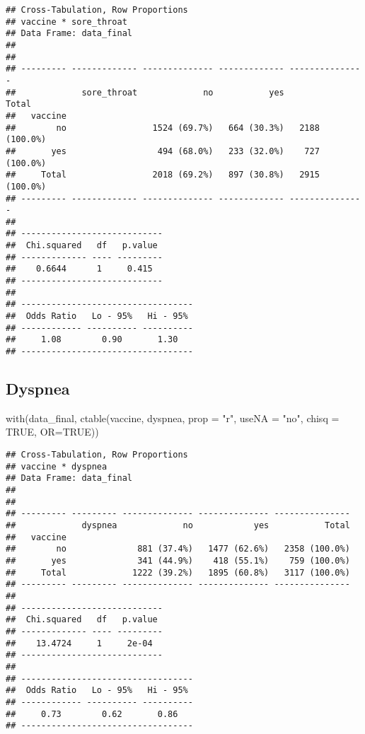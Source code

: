 \documentclass[
]{article}
\newenvironment{Shaded}{\begin{snugshade}}{\end{snugshade}}
\newcommand{\AttributeTok}[1]{\textcolor[rgb]{0.77,0.63,0.00}{#1}}
\newcommand{\ConstantTok}[1]{\textcolor[rgb]{0.00,0.00,0.00}{#1}}
\newcommand{\FunctionTok}[1]{\textcolor[rgb]{0.00,0.00,0.00}{#1}}
\newcommand{\NormalTok}[1]{#1}
\newcommand{\StringTok}[1]{\textcolor[rgb]{0.31,0.60,0.02}{#1}}
\begin{document}
\begin{verbatim}
## Cross-Tabulation, Row Proportions  
## vaccine * sore_throat  
## Data Frame: data_final  
## 
## 
## --------- ------------- -------------- ------------- ---------------
##             sore_throat             no           yes           Total
##   vaccine                                                           
##        no                 1524 (69.7%)   664 (30.3%)   2188 (100.0%)
##       yes                  494 (68.0%)   233 (32.0%)    727 (100.0%)
##     Total                 2018 (69.2%)   897 (30.8%)   2915 (100.0%)
## --------- ------------- -------------- ------------- ---------------
## 
## ----------------------------
##  Chi.squared   df   p.value 
## ------------- ---- ---------
##    0.6644      1     0.415  
## ----------------------------
## 
## ----------------------------------
##  Odds Ratio   Lo - 95%   Hi - 95% 
## ------------ ---------- ----------
##     1.08        0.90       1.30   
## ----------------------------------
\end{verbatim}

\hypertarget{dyspnea}{%
\subsection{Dyspnea}\label{dyspnea}}

\begin{Shaded}
\begin{Highlighting}[]
\FunctionTok{with}\NormalTok{(data\_final, }\FunctionTok{ctable}\NormalTok{(vaccine, dyspnea, }\AttributeTok{prop =} \StringTok{"r"}\NormalTok{, }\AttributeTok{useNA =} \StringTok{"no"}\NormalTok{, }\AttributeTok{chisq =} \ConstantTok{TRUE}\NormalTok{, }\AttributeTok{OR=}\ConstantTok{TRUE}\NormalTok{))}
\end{Highlighting}
\end{Shaded}

\begin{verbatim}
## Cross-Tabulation, Row Proportions  
## vaccine * dyspnea  
## Data Frame: data_final  
## 
## 
## --------- --------- -------------- -------------- ---------------
##             dyspnea             no            yes           Total
##   vaccine                                                        
##        no              881 (37.4%)   1477 (62.6%)   2358 (100.0%)
##       yes              341 (44.9%)    418 (55.1%)    759 (100.0%)
##     Total             1222 (39.2%)   1895 (60.8%)   3117 (100.0%)
## --------- --------- -------------- -------------- ---------------
## 
## ----------------------------
##  Chi.squared   df   p.value 
## ------------- ---- ---------
##    13.4724     1     2e-04  
## ----------------------------
## 
## ----------------------------------
##  Odds Ratio   Lo - 95%   Hi - 95% 
## ------------ ---------- ----------
##     0.73        0.62       0.86   
## ----------------------------------
\end{verbatim}
\end{document}
